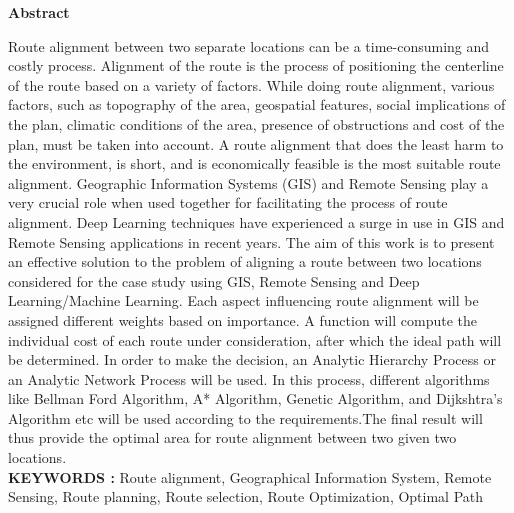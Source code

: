 


\newpage
\begin{center}
\Large \textbf{Abstract}
\end{center}
Route alignment between two separate locations can be a time-consuming and
costly process. Alignment of the route is the process of positioning the centerline of
the route based on a variety of factors. While doing route alignment, various factors,
such as topography of the area, geospatial features, social implications of the plan,
climatic conditions of the area, presence of obstructions and cost of the plan, must
be taken into account. A route alignment that does the least harm to the
environment, is short, and is economically feasible is the most suitable route
alignment. Geographic Information Systems (GIS) and Remote Sensing play a very
crucial role when used together for facilitating the process of route alignment. Deep
Learning techniques have experienced a surge in use in GIS and Remote Sensing
applications in recent years. The aim of this work is to present an effective solution
to the problem of aligning a route between two locations considered for the case
study using GIS, Remote Sensing and Deep Learning/Machine Learning. Each
aspect influencing route alignment will be assigned different weights based on
importance. A function will compute the individual cost of each route under
consideration, after which the ideal path will be determined. In order to make the
decision, an Analytic Hierarchy Process or an Analytic Network Process will be
used. In this process, different algorithms like Bellman Ford Algorithm, A*
Algorithm, Genetic Algorithm, and Dijkshtra's Algorithm etc will be used
according to the requirements.The final result will thus provide the optimal area for
route alignment between two given two locations. \\
\textbf{KEYWORDS : }Route alignment, Geographical Information System, Remote Sensing, Route planning, Route selection, Route Optimization, Optimal Path

